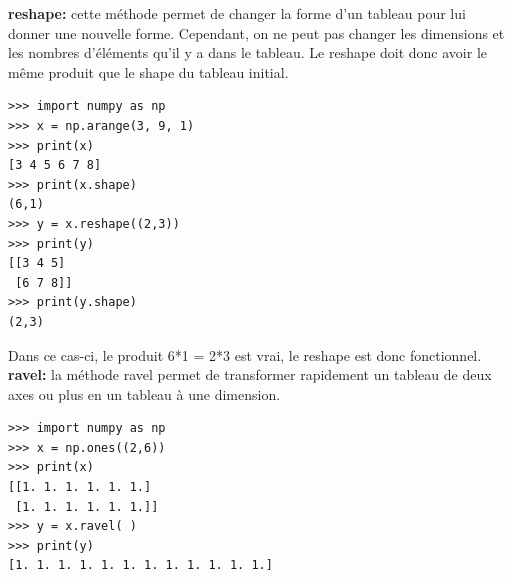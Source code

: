 \documentclass[a4paper, 12pt]{article}
\numberwithin{equation}{subsection}
\begin{document}
\textbf{reshape:} cette méthode permet de changer la forme d’un tableau pour lui donner une nouvelle forme. Cependant, on ne peut pas changer les dimensions et les nombres d’éléments qu’il y a dans le tableau. Le reshape doit donc avoir le même produit que le shape du tableau initial.
\begin{lstlisting}
>>> import numpy as np
>>> x = np.arange(3, 9, 1)
>>> print(x)
[3 4 5 6 7 8]
>>> print(x.shape)
(6,1)
>>> y = x.reshape((2,3))
>>> print(y)
[[3 4 5]
 [6 7 8]]
>>> print(y.shape)
(2,3)
\end{lstlisting}
Dans ce cas-ci, le produit 6*1 = 2*3 est vrai, le reshape est donc fonctionnel.
\\

\textbf{ravel:} la méthode ravel permet de transformer rapidement un tableau de deux axes ou plus en un tableau à une dimension.
\begin{lstlisting}
>>> import numpy as np
>>> x = np.ones((2,6))
>>> print(x)
[[1. 1. 1. 1. 1. 1.]
 [1. 1. 1. 1. 1. 1.]]
>>> y = x.ravel( )
>>> print(y)
[1. 1. 1. 1. 1. 1. 1. 1. 1. 1. 1. 1.]
\end{lstlisting}
\end{document}
